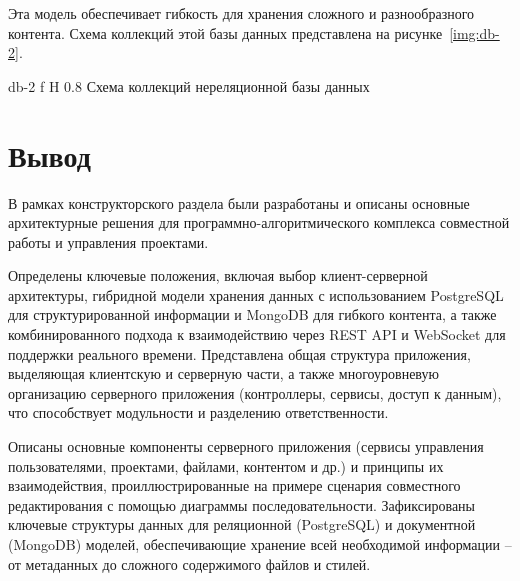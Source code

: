 Эта модель обеспечивает гибкость для хранения сложного и разнообразного контента. 
\clearpage
Схема коллекций этой базы данных представлена на рисунке~\ref{img:db-2}.

	{db-2}
	{f}
	{H}
	{0.8\textwidth}
	{Схема коллекций нереляционной базы данных}

\section*{Вывод}

В рамках конструкторского раздела были разработаны и описаны основные архитектурные решения для программно-алгоритмического комплекса совместной работы и управления проектами.

Определены ключевые положения, включая выбор клиент-серверной архитектуры, гибридной модели хранения данных с использованием PostgreSQL для структурированной информации и MongoDB для гибкого контента, а также комбинированного подхода к взаимодействию через REST API и WebSocket для поддержки реального времени. 
Представлена общая структура приложения, выделяющая клиентскую и серверную части, а также многоуровневую организацию серверного приложения (контроллеры, сервисы, доступ к данным), что способствует модульности и разделению ответственности.

Описаны основные компоненты серверного приложения (сервисы управления пользователями, проектами, файлами, контентом и др.) и принципы их взаимодействия, проиллюстрированные на примере сценария совместного редактирования с помощью диаграммы последовательности. 
Зафиксированы ключевые структуры данных для реляционной (PostgreSQL) и документной (MongoDB) моделей, обеспечивающие хранение всей необходимой информации – от метаданных до сложного содержимого файлов и стилей. 
